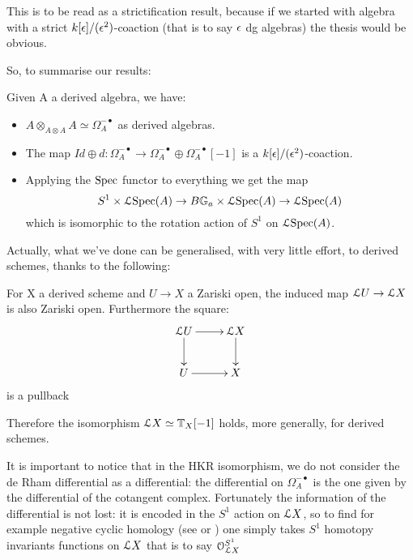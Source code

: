\begin{refsection}
\begin{remark}
This is to be read as a strictification result, because if we started with algebra with a strict $k[\epsilon]/(\epsilon^2)$-coaction (that is to say $\epsilon$ dg algebras) the thesis would be
obvious.
\end{remark}

So, to summarise our results:

\begin{theorem} Given A a derived algebra, we have:
\begin{itemize}
 \item $A\otimes_{A\otimes A}A\simeq \Omega_A^{-\bullet}$ as derived algebras.
 \item The map $Id\oplus d:\Omega_A^{-\bullet}\to\Omega_A^{-\bullet}\oplus \Omega_A^{-\bullet}[-1]$ is a
 $k[\epsilon]/(\epsilon^2)$-coaction.
\item Applying the $\mathrm{Spec}$ functor to everything we get the map $$S^1\times \mathcal{L}\mathrm{Spec}(A)\to B\mathbb{G}_a\times \mathcal{L} \mathrm{Spec}(A)\to\mathcal{L}\mathrm{Spec}(A)$$ which is isomorphic to
the rotation action of $S^1$ on $\mathcal{L} \mathrm{Spec}(A)$.
\end{itemize}
\end{theorem}

Actually, what we've done can be generalised, with very little effort, to derived schemes, thanks to the following:

\begin{proposition} \cite{Be-Na}
For X a derived scheme and $U\to X$ a Zariski open, the induced map $\mathcal{L} U\to \mathcal{L} X$
is also Zariski open. Furthermore the square:
\begin{displaymath}
\xymatrix{
\L U \ar[r] \ar[d] &  \L X \ar[d]\\
 U \ar[r] & X\\
}
\end{displaymath}
is a pullback
\end{proposition}

Therefore the isomorphism $\mathcal{L} X\simeq \mathbb{T}_X[-1]$ holds, more generally, for derived schemes.

\begin{remark}
It is important to notice that in the HKR isomorphism, we do not consider the de Rham differential as a differential: the differential on $\Omega_A^{-\bullet}$ is the one
given by the differential of the cotangent complex. Fortunately the information of the differential is not lost: it is encoded in the $S^1$ action on $\mathcal{L} X$, so to
find for example negative cyclic homology (see \cite{Co} or \cite{Pa-To-Va-Ve}) one simply takes $S^1$ homotopy invariants functions on $\mathcal{L} X$ that is to say
$\mathcal{O}_{\mathcal{L} X}^{S^1}$
\end{remark}


\printbibliography[heading = local]

\end{refsection}
